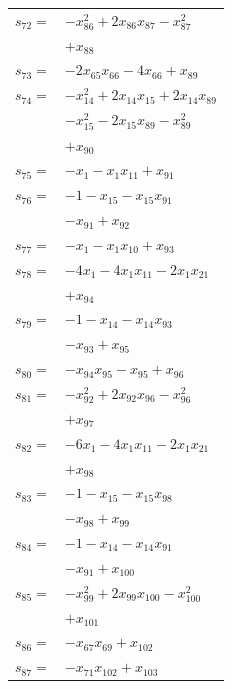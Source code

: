 \begin{longtable}{@{}r@{\;}l@{}}
\(s_{72}=\) & \(\displaystyle -x_{86}^{2} +2x_{86}x_{87} -x_{87}^{2}\) \\
 & \(\displaystyle +x_{88}\) \\[3pt]
\(s_{73}=\) & \(\displaystyle -2x_{65}x_{66} -4x_{66} +x_{89}\) \\[3pt]
\(s_{74}=\) & \(\displaystyle -x_{14}^{2} +2x_{14}x_{15} +2x_{14}x_{89}\) \\
 & \(\displaystyle -x_{15}^{2} -2x_{15}x_{89} -x_{89}^{2}\) \\
 & \(\displaystyle +x_{90}\) \\[3pt]
\(s_{75}=\) & \(\displaystyle -x_{1} -x_{1}x_{11} +x_{91}\) \\[3pt]
\(s_{76}=\) & \(\displaystyle -1 -x_{15} -x_{15}x_{91}\) \\
 & \(\displaystyle -x_{91} +x_{92}\) \\[3pt]
\(s_{77}=\) & \(\displaystyle -x_{1} -x_{1}x_{10} +x_{93}\) \\[3pt]
\(s_{78}=\) & \(\displaystyle -4x_{1} -4x_{1}x_{11} -2x_{1}x_{21}\) \\
 & \(\displaystyle +x_{94}\) \\[3pt]
\(s_{79}=\) & \(\displaystyle -1 -x_{14} -x_{14}x_{93}\) \\
 & \(\displaystyle -x_{93} +x_{95}\) \\[3pt]
\(s_{80}=\) & \(\displaystyle -x_{94}x_{95} -x_{95} +x_{96}\) \\[3pt]
\(s_{81}=\) & \(\displaystyle -x_{92}^{2} +2x_{92}x_{96} -x_{96}^{2}\) \\
 & \(\displaystyle +x_{97}\) \\[3pt]
\(s_{82}=\) & \(\displaystyle -6x_{1} -4x_{1}x_{11} -2x_{1}x_{21}\) \\
 & \(\displaystyle +x_{98}\) \\[3pt]
\(s_{83}=\) & \(\displaystyle -1 -x_{15} -x_{15}x_{98}\) \\
 & \(\displaystyle -x_{98} +x_{99}\) \\[3pt]
\(s_{84}=\) & \(\displaystyle -1 -x_{14} -x_{14}x_{91}\) \\
 & \(\displaystyle -x_{91} +x_{100}\) \\[3pt]
\(s_{85}=\) & \(\displaystyle -x_{99}^{2} +2x_{99}x_{100} -x_{100}^{2}\) \\
 & \(\displaystyle +x_{101}\) \\[3pt]
\(s_{86}=\) & \(\displaystyle -x_{67}x_{69} +x_{102}\) \\[3pt]
\(s_{87}=\) & \(\displaystyle -x_{71}x_{102} +x_{103}\) \\[3pt]

\end{longtable}
